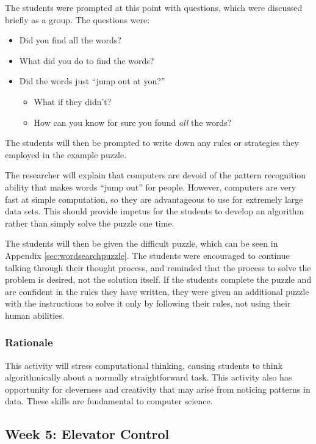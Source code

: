 	The students were prompted at this point with questions, which
	were discussed briefly as a group. The questions were:
	\begin{itemize}
	\item Did you find all the words?
	\item What did you do to find the words?
	\item Did the words just {}``jump out at you?'' 
	
	\begin{itemize}
	\item What if they didn't?
	\item How can you know for sure you found \emph{all} the words?
	\end{itemize}
	\end{itemize}
	The students will then be prompted to write down any rules or strategies
	they employed in the example puzzle. 
	
	The researcher will explain that computers are devoid of the pattern
	recognition ability that makes words {}``jump out'' for people.
	However, computers are very fast at simple computation, so they are
	advantageous to use for extremely large data sets. This should provide
	impetus for the students to develop an algorithm rather than simply
	solve the puzzle one time.
	
	The students will then be given the difficult puzzle, which can be
	seen in Appendix \ref{sec:wordsearchpuzzle}. The students were encouraged
	to continue talking through their thought process, and reminded that
	the process to solve the problem is desired, not the solution itself.
	If the students complete the puzzle and are confident in the rules
	they have written, they were given an additional puzzle with the
	instructions to solve it only by following their rules, not using
	their human abilities.
	
	
	\subsubsection{Rationale}
	
	This activity will stress computational thinking,
	causing students to think algorithmically about a normally straightforward
	task. This activity also has opportunity for cleverness and creativity
	that may arise from noticing patterns in data. These skills are fundamental
	to computer science. 

\subsection{Week 5: Elevator Control}

